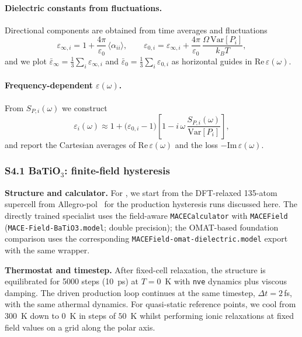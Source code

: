 \documentclass[aps,physrev,graphicx,amsmath,amssymb,reprint]{revtex4-2} %
\begin{document}
\paragraph*{Dielectric constants from fluctuations.}
Directional components are obtained from time averages and fluctuations
\[
\varepsilon_{\infty,i}=1+\frac{4\pi}{\varepsilon_0}\,\langle \alpha_{ii}\rangle,\qquad
\varepsilon_{0,i}=\varepsilon_{\infty,i}+\frac{4\pi}{\varepsilon_0}\,\frac{\Omega\,\mathrm{Var}[P_i]}{k_BT},
\]
and we plot $\bar\varepsilon_\infty=\tfrac13\sum_i\varepsilon_{\infty,i}$ and
$\bar\varepsilon_0=\tfrac13\sum_i\varepsilon_{0,i}$ as horizontal guides in $\mathrm{Re}\,\varepsilon(\omega)$.
\\

\paragraph*{Frequency-dependent $\varepsilon(\omega)$.}
From $S_{P,i}(\omega)$ we construct
\[
\varepsilon_i(\omega)\approx 1+\big(\varepsilon_{0,i}-1\big)
\left[1-i\,\omega\,\frac{S_{P,i}(\omega)}{\mathrm{Var}[P_i]}\right],
\]
and report the Cartesian averages of $\mathrm{Re}\,\varepsilon(\omega)$ and the loss $-\mathrm{Im}\,\varepsilon(\omega)$.

\subsubsection*{S4.1 BaTiO\texorpdfstring{$_3$}{3}: finite-field hysteresis}

\textbf{Structure and calculator.}
For , we start from the DFT-relaxed 135-atom supercell from Allegro-pol~\cite{allegro-pol-2025} for the production hysteresis runs discussed here. The directly trained specialist uses the field-aware \texttt{MACECalculator} with \texttt{MACEField}
(\texttt{MACE-Field-BaTiO3.model}; double precision); the OMAT-based foundation comparison uses the corresponding \texttt{MACEField-omat-dielectric.model} export with the same wrapper.

\textbf{Thermostat and timestep.}
After fixed-cell relaxation, the structure is equilibrated for 5000 steps (10~ps) at $T=0$~\si{K} with \texttt{nve} dynamics plus viscous damping. The driven production loop continues at the same timestep, $\Delta t=2$\,fs, with the same athermal dynamics. For quasi-static reference points, we cool from $300$~\si{K} down to $0$~\si{K} in steps of $50$~\si{K} whilst performing ionic relaxations at fixed field values on a grid along the polar axis.
\end{document}
